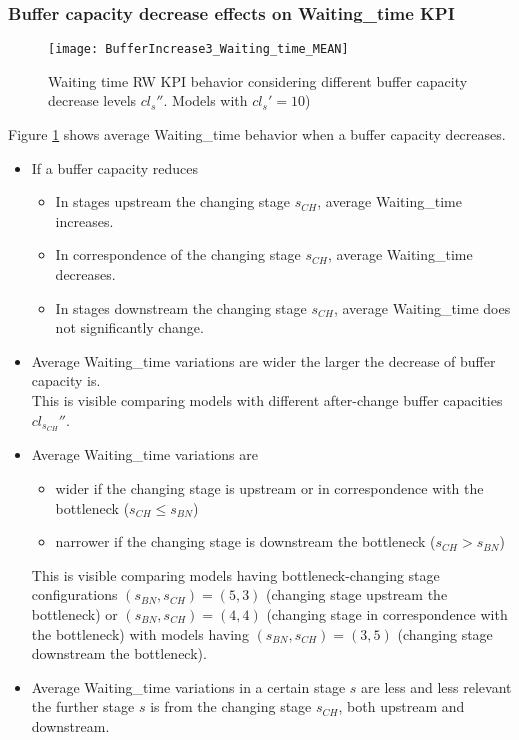 \subsubsection{Buffer capacity decrease effects on Waiting\_time KPI}
\begin{figure}[h]
\centering
\texttt{[image: BufferIncrease3\_Waiting\_time\_MEAN]}
\caption[Waiting time RW KPI behavior with different buffer capacity decrease levels]{Waiting time RW KPI behavior considering different buffer capacity decrease levels  $cl_s''$. Models with $cl_s'=10$)}
\label{fig:Waiting time RW KPI behavior with different buffer capacity decrease levels}
\end{figure}
Figure \ref{fig:Waiting time RW KPI behavior with different buffer capacity decrease levels} shows average Waiting\_time behavior when a buffer capacity decreases.
\begin{itemize}
\item If a buffer capacity reduces 
\begin{itemize}
\item In stages upstream the changing stage $s_{CH}$, average Waiting\_time increases.
\item In correspondence of the changing stage $s_{CH}$, average Waiting\_time decreases.
\item In stages downstream the changing stage $s_{CH}$, average Waiting\_time does not significantly change.
\end{itemize}
\item Average Waiting\_time variations are wider the larger the decrease of buffer capacity is. \\This is visible comparing models with different after-change buffer capacities $cl_{s_{CH}}''$. 
\item Average Waiting\_time variations are 
\begin{itemize}
\item wider if the changing stage is upstream or in correspondence with the bottleneck ($s_{CH} \leqslant s_{BN}$)
\item narrower if the changing stage is downstream the bottleneck ($s_{CH}>s_{BN}$)
\end{itemize}
This is visible comparing models having bottleneck-changing stage configurations $(s_{BN},s_{CH})=(5,3)$ (changing stage upstream the bottleneck) or $(s_{BN},s_{CH})=(4,4)$ (changing stage in correspondence with the bottleneck) with models having $(s_{BN},s_{CH})=(3,5)$ (changing stage downstream the bottleneck). 
\item Average Waiting\_time variations in a certain stage $s$ are less and less relevant the further stage $s$ is from the changing stage $s_{CH}$, both upstream and downstream. 
\end{itemize}
